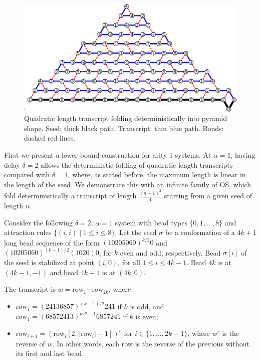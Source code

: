 \begin{figure}
	\centering
	\includegraphics[width=0.7\linewidth]{./Fig/CI_NumbersNew}
	\caption{Quadratic length transcript folding deterministically into pyramid shape. Seed: thick black path. Transcript: thin blue path. Bonds: dashed red lines. }
	\label{CI:big}
\end{figure}

First we present a lower bound construction for arity $1$ systems. At $\alpha=1$, having delay $\delta=2$ allows the deterministic folding of quadratic length transcripts compared with $\delta=1$, where, as stated before, the maximum length is linear in the length of the seed. We demonstrate this with an infinite family of OS, which fold deterministically a transcript of length $\frac{(n-1)^2}{4}$ starting from a given seed of length $n$.



Consider the following $\delta=2$, $\alpha=1$ system with bead types $\{0,1,\dots,8\}$ and attraction rules $\{(i,i) \mid 1\leq i\leq 8\}$. Let the seed $\sigma$ be a conformation of a $4k+1$ long bead sequence of the form $(10205060)^{k/2}0$ and $(10205060)^{(k-1)/2}(1020)0$, for $k$ even and odd, respectively. Bead $\sigma[i]$ of the seed is stabilized at point $(i,0)$, for all $1\leq i\leq 4k-1$. Bead $4k$ is at $(4k-1,-1)$ and bead $4k+1$ is at $(4k,0)$.
\vspace{0.1cm}

The transcript is $w=\mathrm{row}_1\cdots \mathrm{row}_{2k}$, where 
\begin{itemize}
	\item $\mathrm{row}_1=(24136857)^{(k-1)/2}241$ if $k$ is odd, and $\mathrm{row}_1=(68572413)^{k/2-1}6857241$ if $k$ is even;
	\item $\mathrm{row}_{i+1}=(\mathrm{row}_i[2..|\mathrm{row}_i|-1])^r$ for $i\in \{1,\dots, 2k-1\}$, where $w^r$ is the reverse of $w$. In other words, each row is the reverse of the previous without its first and last bead.
\end{itemize}


